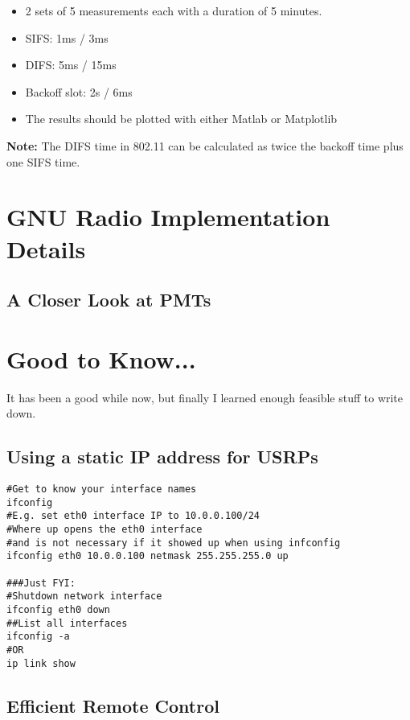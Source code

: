 \documentclass{article}
\begin{document}
\begin{itemize}
	\item 2 sets of 5 measurements each with a duration of 5 minutes.
	\item SIFS: 1ms / 3ms 
	\item DIFS: 5ms  / 15ms 
	\item Backoff slot: 2s / 6ms
	\item The results should be plotted with either Matlab or Matplotlib
\end{itemize}

\textbf{Note:} The DIFS time in 802.11 can be calculated as twice the backoff time plus one SIFS time.

\section{GNU Radio Implementation Details}

\subsection{A Closer Look at PMTs}

\section{Good to Know...}

It has been a good while now, but finally I learned enough feasible stuff to write down.

\subsection{Using a static IP address for USRPs}
\begin{verbatim}
#Get to know your interface names
ifconfig 
#E.g. set eth0 interface IP to 10.0.0.100/24
#Where up opens the eth0 interface 
#and is not necessary if it showed up when using infconfig
ifconfig eth0 10.0.0.100 netmask 255.255.255.0 up

###Just FYI:
#Shutdown network interface
ifconfig eth0 down
##List all interfaces
ifconfig -a
#OR
ip link show
\end{verbatim}

\subsection{Efficient Remote Control}
\end{document}
